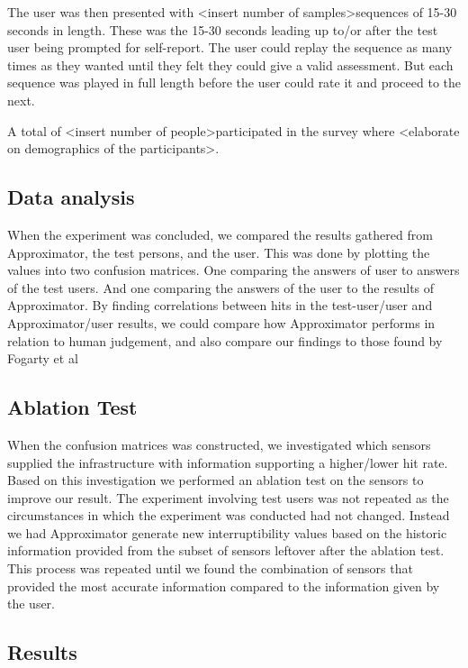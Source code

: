 \documentclass{sigchi}
\begin{document}
The user was then presented with \textless insert number of samples\textgreater sequences of 15-30 seconds in length.
These was the 15-30 seconds leading up to/or after the test user being prompted for self-report.
The user could replay the sequence as many times as they wanted until they felt they could give a valid assessment.
But each sequence was played in full length before the user could rate it and proceed to the next.

A total of \textless insert number of people\textgreater participated in the survey where \textless elaborate on demographics of the participants\textgreater.

\subsection{Data analysis}
When the experiment was concluded, we compared the results gathered from Approximator, the test persons, and the user.
This was done by plotting the values into two confusion matrices.
One comparing the answers of user to answers of the test users.
And one comparing the answers of the user to the results of Approximator.
By finding correlations between hits in the test-user/user and Approximator/user results, we could compare how Approximator performs in relation to human judgement, and also compare our findings to those found by Fogarty et al \cite{fogarty2005predicting}

\subsection{Ablation Test}
When the confusion matrices was constructed, we investigated which sensors supplied the infrastructure with information supporting a higher/lower hit rate.
Based on this investigation we performed an ablation test on the sensors to improve our result.
The experiment involving test users was not repeated as the circumstances in which the experiment was conducted had not changed.
Instead we had Approximator generate new interruptibility values based on the historic information provided from the subset of sensors leftover after the ablation test.
This process was repeated until we found the combination of sensors that provided the most accurate information compared to the information given by the user.

\subsection{Results}
\end{document}
